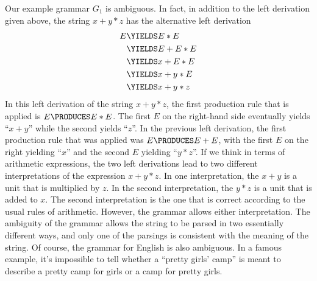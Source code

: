 Our example grammar $G_1$ is ambiguous.  In fact, in addition to the
left derivation given above, the string $x+y*z$ has the alternative
left derivation
\begin{align*}
   E &\YIELDS E*E\\
     &\YIELDS E+E*E\\
     &\YIELDS x+E*E\\
     &\YIELDS x+y*E\\
     &\YIELDS x+y*z
\end{align*}
In this left derivation of the string $x+y*z$, the first production
rule that is applied is $E\PRODUCES E*E$.  The first $E$ on the right-hand
side eventually yields ``$x+y$'' while the second yields ``$z$''.
In the previous left derivation, the first production rule that was
applied was $E\PRODUCES E+E$, with the first $E$ on the right yielding
``$x$'' and the second $E$ yielding ``$y*z$''.  If we think in terms
of arithmetic expressions, the two left derivations lead to
two different interpretations of the expression $x+y*z$.  In one
interpretation, the $x+y$ is a unit that is multiplied by $z$.
In the second interpretation, the $y*z$ is a unit that is added to $x$.
The second interpretation is the one that is correct according to
the usual rules of arithmetic.  However, the grammar allows either
interpretation.  The ambiguity of the grammar allows the string to
be parsed in two essentially different ways, and only one of the
parsings is consistent with the meaning of the string.  Of course,
the grammar for English is also ambiguous.  In a famous example,
it's impossible to tell whether a ``pretty girls' camp'' is
meant to describe a pretty camp for girls or a camp for pretty girls.

